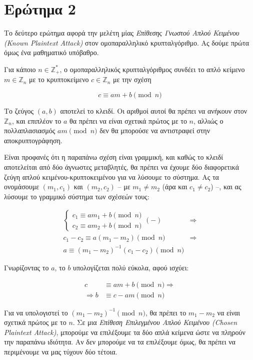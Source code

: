 \documentclass{article}
\begin{document}
\section*{Ερώτημα 2}

Το δεύτερο ερώτημα αφορά την μελέτη μίας \emph{Επίθεσης Γνωστού Απλού Κειμένου (Known Plaintext Attack)} στον ομοπαραλληλικό κρυπταλγόριθμο. Ας δούμε πρώτα όμως ένα μαθηματικό υπόβαθρο.

Για κάποιο $n \in \mathbb{Z}_+^*$, ο ομοπαραλληλικός κρυπταλγόριθμος συνδέει το απλό κείμενο $m \in \mathbb{Z}_n$ με το κρυπτοκείμενο $c \in \mathbb{Z}_n$ με την σχέση

$$c \equiv am + b \pmod n$$

Το ζεύγος $(a, b)$ αποτελεί το κλειδί. Οι αριθμοί αυτοί θα πρέπει να ανήκουν στον $\mathbb{Z}_n$, και επιπλέον το $a$ θα πρέπει να είναι σχετικά πρώτος με το $n$, αλλιώς ο πολλαπλασιασμός $am \pmod n$ δεν θα μπορούσε να αντιστραφεί στην αποκρυπτογράφηση.

Είναι προφανές ότι η παραπάνω σχέση είναι γραμμική, και καθώς το κλειδί αποτελείται από δύο άγνωστες μεταβλητές, θα πρέπει να έχουμε δύο διαφορετικά ζεύγη απλού κειμένου-κρυπτοκειμένου για να λύσουμε το σύστημα. Ας τα ονομάσουμε $(m_1, c_1)$ και $(m_2, c_2)$ -- με $m_1 \ne m_2$ (άρα και $c_1 \ne c_2$) --, και ας λύσουμε το γραμμικό σύστημα των σχέσεών τους:

\begin{equation} \label{crack_a}
\begin{split}
\begin{cases}
c_1 \equiv a m_1 + b \pmod n \\
c_2 \equiv a m_2 + b \pmod n
\end{cases} (-) &\Rightarrow \\
c_1 - c_2 \equiv a(m_1 - m_2) \pmod n &\Rightarrow \\
a \equiv (m_1 - m_2)^{-1} (c_1 - c_2) \pmod n
\end{split}
\end{equation}

Γνωρίζοντας το $a$, το $b$ υπολογίζεται πολύ εύκολα, αφού ισχύει:

\begin{align*}
c &\equiv am + b \pmod n \Rightarrow \\
\Rightarrow b &\equiv c - am \pmod n
\end{align*}

Για να υπολογιστεί το $(m_1 - m_2)^{-1} \pmod n$, θα πρέπει το $m_1 - m_2$ να είναι σχετικά πρώτος με το $n$. Σε μια \emph{Επίθεση Επιλεγμένου Απλού Κειμένου (Chosen Plaintext Attack)}, μπορούμε να επιλέξουμε τα δύο απλά κείμενα ώστε να πληρούν την παραπάνω ιδιότητα. Αν δεν μπορούμε να τα επιλέξουμε όμως, θα πρέπει να περιμένουμε να μας τύχουν δύο τέτοια.
\end{document}
